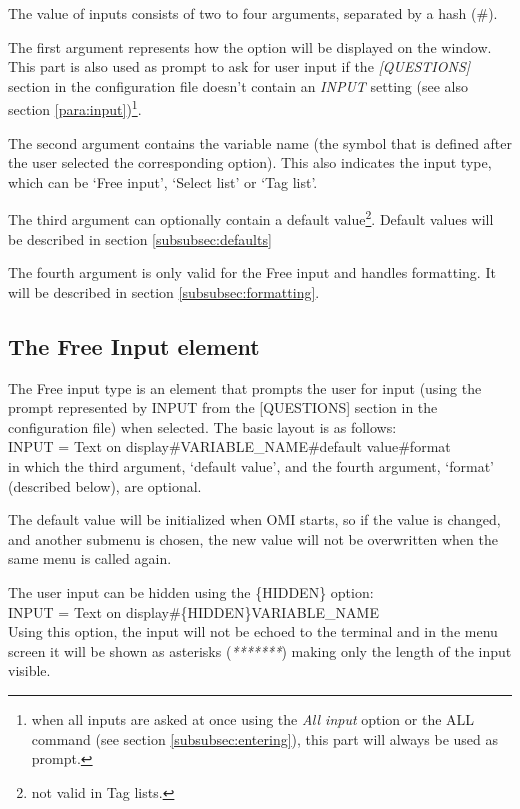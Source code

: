 \documentclass[a4paper]{book}
\newcommand{\vs}{\vspace{3mm}}
\renewcommand{\indent}{\hspace*{5mm}}
\begin{document}
\vs

The value of inputs consists of two to four arguments, separated by a hash 
(\textsf{{\#}}).

The first argument represents how the option will be displayed on the 
window.\\
This part is also used as prompt to ask for user input if the \textsl{[QUESTIONS]} section in the
configuration file doesn't contain an \textsl{INPUT} setting (see also section \ref{para:input})\footnote{ when all inputs are asked
at once using the \textsl{All input} option or the \textsf{ALL} command (see section \ref{subsubsec:entering}), this
part will always be used as prompt.}.

The second argument contains the variable name (the symbol that is defined 
after the user selected the corresponding option). This also indicates the 
input type, which can be `Free input', `Select list' 
or `Tag list'.

The third argument can optionally contain a default value\footnote{ not valid in Tag lists.}.
Default values will be described in section \ref{subsubsec:defaults}

The fourth argument is only valid for the Free input and handles formatting. It will be 
described in section \ref{subsubsec:formatting}.

\subsection{The Free Input element}
\label{subsubsec:mylabel37}

The Free input type is an element that prompts the user for input (using 
the prompt represented by \textsf{INPUT} from the \textsf{[QUESTIONS]} section in the 
configuration file) when selected. The basic layout is as follows:\\
\indent\textsf{INPUT = Text on display{\#}VARIABLE{\_}NAME{\#}default value{\#}format} \\
in which the third argument, `default value', and the fourth argument, 
`format' (described below), are optional.

The default value will be initialized when OMI starts, so if the value is 
changed, and another submenu is chosen, the new value will not be 
overwritten when the same menu is called again.

\vs

The user input can be hidden using the \textsf{\{HIDDEN\}} option:\\ 
\indent\textsf{INPUT = Text on display{\#}\{HIDDEN\}VARIABLE{\_}NAME} \\
Using this option, the input will not be echoed to the terminal and in the menu screen it will be
shown as asterisks (\textsl{*******}) making only the length of the input visible.
\end{document}
